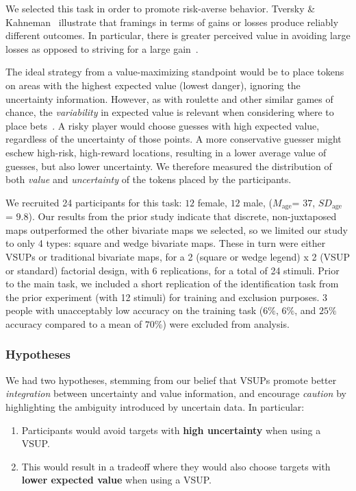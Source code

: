 We selected this task in order to promote risk-averse behavior. Tversky \& Kahneman~\cite{tversky1985framing} illustrate that framings in terms of gains or losses produce reliably different outcomes. In particular, there is greater perceived value in avoiding large losses as opposed to striving for a large gain~\cite{kahneman1979prospect}. 

The ideal strategy from a value-maximizing standpoint would be to place tokens on areas with the highest expected value (lowest danger), ignoring the uncertainty information. However, as with roulette and other similar games of chance, the \emph{variability} in expected value is relevant when considering where to place bets~\cite{mlodinow2009drunkard}. A risky player would choose guesses with high expected value, regardless of the uncertainty of those points. A more conservative guesser might eschew high-risk, high-reward locations, resulting in a lower average value of guesses, but also lower uncertainty. We therefore measured the distribution of both \emph{value} and \emph{uncertainty} of the tokens placed by the participants.

 We recruited 24 participants for this task: $12$ female, $12$ male, ($M_{\text{age}}$= $37$, $SD_{\text{age}}$ = $9.8$). Our results from the prior study indicate that discrete, non-juxtaposed maps outperformed the other bivariate maps we selected, so we limited our study to only 4 types: square and wedge bivariate maps. These in turn were either VSUPs or traditional bivariate maps, for a 2 (square or wedge legend) x 2 (VSUP or standard) factorial design, with 6 replications, for a total of 24 stimuli. Prior to the main task, we included a short replication of the identification task from the prior experiment (with 12 stimuli) for training and exclusion purposes. 3 people with unacceptably low accuracy on the training task ($6\%$, $6\%$, and $25\%$ accuracy compared to a mean of $70\%$) were excluded from analysis. 

\subsubsection{Hypotheses}

We had two hypotheses, stemming from our belief that VSUPs promote better \emph{integration} between uncertainty and value information, and encourage \emph{caution} by highlighting the ambiguity introduced by uncertain data. In particular:
\begin{enumerate}
	\item Participants would avoid targets with \textbf{high uncertainty} when using a VSUP.
	\item This would result in a tradeoff where they would also choose targets with \textbf{lower expected value} when using a VSUP.
\end{enumerate}

